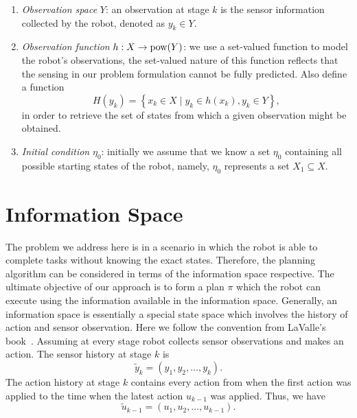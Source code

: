 \begin{enumerate}
\item \emph{Observation space} $Y$: an observation at stage $k$ is the sensor
  information collected by the robot, denoted as $y_k \in Y$.
\item \emph{Observation function} $h : X \to \operatorname{pow}(Y) $: we use a set-valued
  function to model the robot's observations, the set-valued nature of this function reflects
  that the sensing in our problem formulation cannot be fully predicted. Also
  define a function
  \begin{equation}
    \label{eq:preimage}
    H(y_k) = \left\{ x_k \in X \mid y_k \in h(x_k), y_k \in Y \right\},
  \end{equation}
  in order to retrieve the set of states from which a given observation might be obtained.
\item \emph{Initial condition} $\eta_0$: initially we assume that we know a set
  $\eta_0$ containing all possible starting states of the robot, namely,
  $\eta_0$ represents a set $X_1\subseteq X$. 
\end{enumerate}

\section{Information Space}
\label{sec:ispace}
The problem we address here is in a scenario in which the robot is able to complete
tasks without knowing the exact states. 
%
Therefore, the planning algorithm can be considered in terms of the information space respective.  
%
The ultimate objective of our approach is to form a plan $\pi$ which the robot can execute using the
information available in the information space.
%
Generally, an information space is essentially a special state space which involves the history of action and sensor observation. 
%
Here we follow the convention from LaValle's book~\cite{Lav06}. 
%
Assuming at every stage robot collects sensor observations and makes an action. 
The sensor history at stage $k$ is
\begin{equation}
  \label{eq:sensor-hist}
  \tilde{y}_k = (y_1, y_2, \ldots, y_k).
\end{equation}
The action history at stage $k$ contains every action from when the first action
was applied to the time when the latest action $u_{k-1}$ was applied. 
Thus, we have
\begin{equation}
  \label{eq:action-hist}
  \tilde{u}_{k-1} = (u_1, u_2, \ldots, u_{k-1}).
\end{equation}

